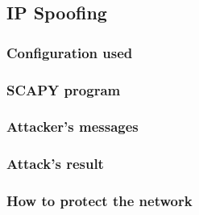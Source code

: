 \subsection{IP Spoofing}
\subsubsection{Configuration used}

\subsubsection{SCAPY program}


\subsubsection{Attacker's messages}

\subsubsection{Attack's result}


\subsubsection{How to protect the network}

